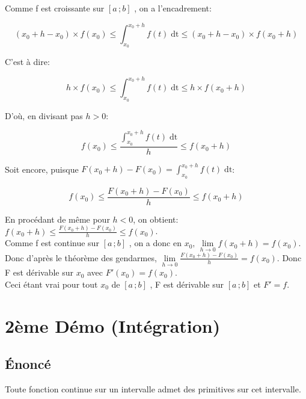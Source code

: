 \documentclass[12px]{article}
\newcommand\I{$[a\,;b]$ }
\newcommand\dt{f(t)\;\mathrm{dt}}
\begin{document}
	Comme f est croissante sur \I, on a l'encadrement:
	\begin{center}
		\begin{displaymath}
			(x_0 +h -x_0 ) \times f(x_0) 
				\leq 
			\int_{x_0}^{x_0 +h}\dt 
				\leq 
			(x_0 +h -x_0) \times f(x_0 +h)
		\end{displaymath}
	\end{center}
	C'est à dire:
	\begin{center}
		\begin{displaymath}
			h \times f(x_0) 
			\leq 
			\int_{x_0}^{x_0 +h}\dt 
			\leq 
			h \times f(x_0 +h)
		\end{displaymath}
	\end{center}
	D'où, en divisant pas $h>0$:
	\begin{center}
		\begin{displaymath}
			f(x_0) \leq \frac{\int_{x_0}^{x_0 +h}\dt}{h} \leq f(x_0 +h)
		\end{displaymath}
	\end{center}
	Soit encore, puisque $F(x_0 +h) - F(x_0) = \int_{x_0}^{x_0 +h}\dt$:
	\begin{center}
		\begin{displaymath}
			f(x_0) \leq \frac{F(x_0 +h) - F(x_0)}{h} \leq f(x_0 +h)
		\end{displaymath}
	\end{center}
	En procédant de même pour $h<0$, on obtient:
	$f(x_0 +h) \leq \frac{F(x_0 +h) - F(x_0)}{h} \leq f(x_0)$.\\
	Comme f est continue sur \I, on a donc en $x_0,\, \lim\limits_{h \rightarrow 0} f(x_0 +h) = f(x_0)$.\\
	Donc d'après le théorème des gendarmes, 
	$\lim\limits_{h \rightarrow 0}\frac{F(x_0 +h) - F(x_0)}{h} = f(x_0)$.
	Donc F est dérivable sur $x_0$ avec $F'(x_0) = f(x_0)$.\\
	Ceci étant vrai pour tout $x_0$ de \I, F est dérivable sur \I et $F'=f$.
	
	
	\section{2ème Démo (Intégration)}
	
	\subsection{\'Enoncé}
	Toute fonction continue sur un intervalle admet des primitives sur cet intervalle.
	
\end{document}
